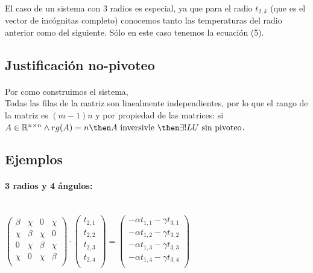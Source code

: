 \documentclass[12pt]{article}
\newcommand{\Gpmatrix}[1]{\ensuremath{\begin{pmatrix} #1 \end{pmatrix}}}
\newcommand{\sub}[3]{\ensuremath{#1_{#2,#3}}}
\begin{document}
\paragraph{} El caso de un sistema con 3 radios es especial, ya que para el radio \(\sub{t}{2}{k}\) (que es el vector de incógnitas completo) conocemos tanto las temperaturas del radio anterior como del siguiente. Sólo en este caso tenemos la ecuación (5).

\subsection{Justificación no-pivoteo} 

\paragraph{} Por como construimos el sistema, \\ %
Todas las filas de la matriz son linealmente independientes, por lo que el rango de la matriz es \((m-1)n\) y por propiedad de las matrices: si \(A \in \mathbb{R}^{n \times n} \land rg(A) = n \then A \text{ inversivle } \then \exists! LU \text{ sin pivoteo}\). %

\subsection{Ejemplos}

\paragraph{3 radios y 4 ángulos:} \ \\

\(
\Gpmatrix{
  \beta & \chi & 0 & \chi \\
  \chi & \beta & \chi & 0 \\
  0 & \chi & \beta & \chi \\
  \chi & 0 & \chi & \beta \\
} \cdot \Gpmatrix{
  \sub{t}{2}{1} \\
  \sub{t}{2}{2} \\
  \sub{t}{2}{3} \\
  \sub{t}{2}{4} \\
} = \Gpmatrix{
  -\alpha\sub{t}{1}{1} - \gamma\sub{t}{3}{1} \\
  -\alpha\sub{t}{1}{2} - \gamma\sub{t}{3}{2} \\
  -\alpha\sub{t}{1}{3} - \gamma\sub{t}{3}{3} \\
  -\alpha\sub{t}{1}{4} - \gamma\sub{t}{3}{4} \\
}
\)
\end{document}
